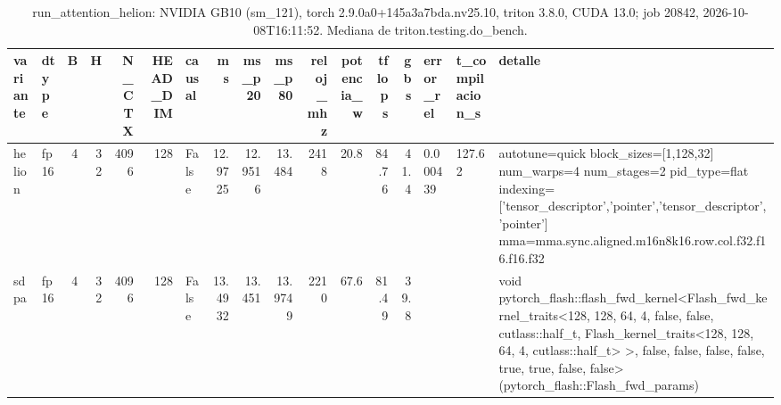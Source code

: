 \begin{table}[htbp]
  \centering\small
  \begin{tabular}{llrrrrlrrrrrrrlll}
    \toprule
    variante & dtype & B & H & N\_CTX & HEAD\_DIM & causal & ms & ms\_p20 & ms\_p80 & reloj\_mhz & potencia\_w & tflops & gbs & error\_rel & t\_compilacion\_s & detalle \\
    \midrule
    helion & fp16 & 4 & 32 & 4096 & 128 & False & 12.9725 & 12.9516 & 13.484 & 2418 & 20.8 & 84.76 & 41.4 & 0.000439 & 127.62 & autotune=quick block\_sizes=[1,128,32] num\_warps=4 num\_stages=2 pid\_type=flat indexing=['tensor\_descriptor','pointer','tensor\_descriptor','pointer'] mma=mma.sync.aligned.m16n8k16.row.col.f32.f16.f16.f32 \\
    sdpa & fp16 & 4 & 32 & 4096 & 128 & False & 13.4932 & 13.451 & 13.9749 & 2210 & 67.6 & 81.49 & 39.8 &  &  & void pytorch\_flash::flash\_fwd\_kernel<Flash\_fwd\_kernel\_traits<128, 128, 64, 4, false, false, cutlass::half\_t, Flash\_kernel\_traits<128, 128, 64, 4, cutlass::half\_t> >, false, false, false, false, true, true, false, false>(pytorch\_flash::Flash\_fwd\_params) \\
    \bottomrule
  \end{tabular}
  \caption{run\_attention\_helion: NVIDIA GB10 (sm\_121), torch 2.9.0a0+145a3a7bda.nv25.10, triton 3.8.0, CUDA 13.0; job 20842, 2026-10-08T16:11:52. Mediana de triton.testing.do\_bench.}
  \label{tab:hennessy-frio-run-attention-helion}
\end{table}

